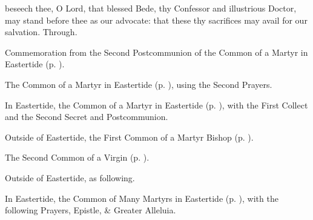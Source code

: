 \postcommunion
{} beseech thee, O Lord, that blessed Bede, thy Confessor and illustrious Doctor, may stand before thee as our advocate: that these thy sacrifices may avail for our salvation. Through.

\begin{rubric}
	Commemoration  from the Second Postcommunion of the Common of a Martyr in Eastertide (p. \pageref{CommonMartyrEaster}).
\end{rubric}


\clearpage
{}

\begin{rubric}
	The Common of a Martyr in Eastertide (p. \pageref{CommonMartyrEaster}), using the Second Prayers.
\end{rubric}



\begin{rubric}
	In Eastertide, the Common of a Martyr in Eastertide (p. \pageref{CommonMartyrEaster}), with the First Collect and the Second Secret and Postcommunion.
\end{rubric}

\begin{rubric}
	Outside of Eastertide, the First Common of a Martyr Bishop (p. \pageref{CommonMartyrBishopI}).
\end{rubric}



\begin{rubric}
	The Second Common of a Virgin (p. \pageref{CommonVirginOnlyII}).
\end{rubric}



\begin{rubric}
	Outside of Eastertide, as following.
\end{rubric}

\begin{rubric}
	In Eastertide, the Common of Many Martyrs in Eastertide (p. \pageref{CommonMartyrsEaster}), with the following Prayers, Epistle, \& Greater Alleluia.
\end{rubric}


